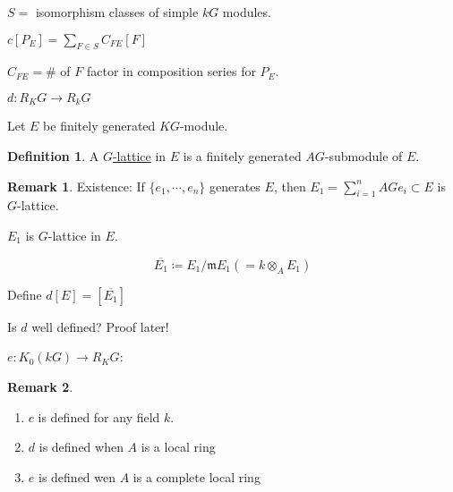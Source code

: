 \documentclass{article}
\theoremstyle{definition}
\newtheorem*{definition}{Definition}
\newtheorem*{remark}{Remark}
\begin{document}
\(S =\) isomorphism classes of simple \(kG\) modules.

\begin{center}
\end{center}

\(c[P_E] = \sum_{F\in S} C_{FE} [F] \) 

\(C_{FE} = \#\) of \(F\) factor in composition series for \(P_E\). 

\(d: R_K G \to R_k G\)

Let \(E\) be finitely generated \(KG\)-module.

\begin{definition}
    A \underline{\(G\)-lattice} in \(E\) is a finitely generated \(AG\)-submodule of \(E\).
\end{definition}

\begin{remark}
    Existence: If \(\{ e_1, \cdots , e_n \}\) generates \(E\), then \(E_1 = \sum_{i=1}^n AG e_i \subset E\) is \(G\)-lattice.  
\end{remark}

\(E_1\) is \(G\)-lattice in \(E\).

\[
    \overline{E_1} \coloneqq E_1 / \mathfrak{m} E_1 (= k \otimes_A E_1)
\]

Define \(d[E] = [\overline{E_1}]\) 

Is \(d\) well defined? Proof later!

\(e: K_0(kG) \to R_K G\):

\begin{center}
\end{center}

\begin{remark}
    \begin{enumerate}[label=\roman*)]
        \item \(c\) is defined for any field \(k\).
        \item \(d\) is defined when \(A\) is a local ring 
        \item \(e\) is defined wen \(A\) is a complete local ring
    \end{enumerate} 
\end{remark}
\end{document}
